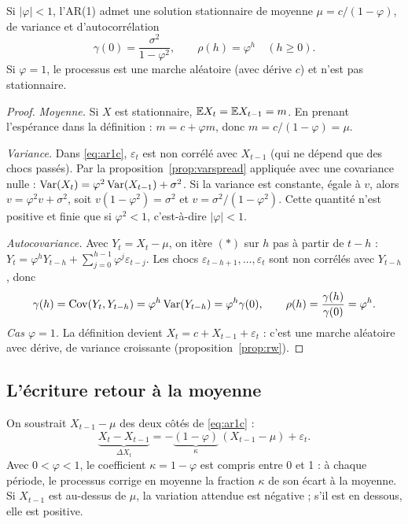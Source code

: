 \documentclass[11pt,a4paper]{article}
\begin{document}
\begin{proposition}\label{prop:ar1}
Si $|\varphi| < 1$, l'AR(1) admet une solution stationnaire de moyenne $\mu = c/(1-\varphi)$, de variance et d'autocorrélation
\[
\gamma(0) = \frac{\sigma^2}{1-\varphi^2}, \qquad \rho(h) = \varphi^{h}\quad (h\ge0).
\]
Si $\varphi = 1$, le processus est une marche aléatoire (avec dérive $c$) et n'est pas stationnaire.
\end{proposition}
\begin{proof}
\emph{Moyenne.} Si $X$ est stationnaire, $\mathbb{E} X_t = \mathbb{E} X_{t-1} = m$. En prenant l'espérance dans la définition : $m = c + \varphi m$, donc $m = c/(1-\varphi) = \mu$.

\emph{Variance.} Dans \eqref{eq:ar1c}, $\varepsilon_t$ est non corrélé avec $X_{t-1}$ (qui ne dépend que des chocs passés). Par la proposition~\ref{prop:varspread} appliquée avec une covariance nulle : $\operatorname{Var}(X_t) = \varphi^2\operatorname{Var}(X_{t-1}) + \sigma^2$. Si la variance est constante, égale à $v$, alors $v = \varphi^2 v + \sigma^2$, soit $v(1-\varphi^2) = \sigma^2$ et $v = \sigma^2/(1-\varphi^2)$. Cette quantité n'est positive et finie que si $\varphi^2<1$, c'est-à-dire $|\varphi|<1$.

\emph{Autocovariance.} Avec $Y_t = X_t-\mu$, on itère $(\ast)$ sur $h$ pas à partir de $t-h$ : $Y_t = \varphi^h Y_{t-h} + \sum_{j=0}^{h-1}\varphi^j\varepsilon_{t-j}$. Les chocs $\varepsilon_{t-h+1},\dots,\varepsilon_t$ sont non corrélés avec $Y_{t-h}$, donc
\[
\gamma(h) = \operatorname{Cov}(Y_t, Y_{t-h}) = \varphi^h\operatorname{Var}(Y_{t-h}) = \varphi^h\gamma(0), \qquad \rho(h) = \frac{\gamma(h)}{\gamma(0)} = \varphi^h.
\]
\emph{Cas $\varphi=1$.} La définition devient $X_t = c + X_{t-1} + \varepsilon_t$ : c'est une marche aléatoire avec dérive, de variance croissante (proposition~\ref{prop:rw}).
\end{proof}

\subsection{L'écriture \og retour à la moyenne\fg}

On soustrait $X_{t-1}-\mu$ des deux côtés de \eqref{eq:ar1c} :
\begin{equation}\label{eq:ecm}
\underbrace{X_t - X_{t-1}}_{\Delta X_t} = -\underbrace{(1-\varphi)}_{\kappa}\,(X_{t-1}-\mu) + \varepsilon_t.
\end{equation}
Avec $0<\varphi<1$, le coefficient $\kappa = 1-\varphi$ est compris entre 0 et 1 : à chaque période, le processus corrige en moyenne la fraction $\kappa$ de son écart à la moyenne. Si $X_{t-1}$ est au-dessus de $\mu$, la variation attendue est négative ; s'il est en dessous, elle est positive.
\end{document}
